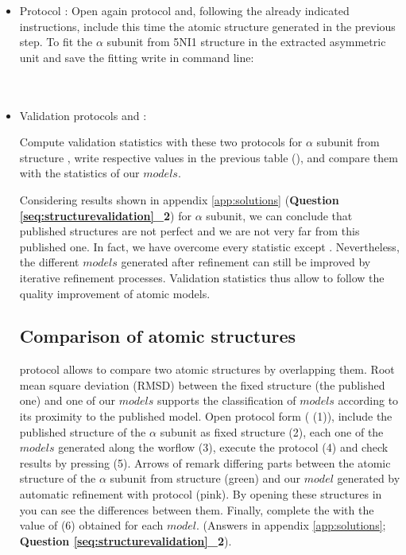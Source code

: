 \begin{itemize}
    \item Protocol :
    Open again \chimera {} protocol and, following the already indicated instructions, include this time the atomic structure  generated in the previous step. To fit the  $\alpha$ subunit from 5NI1 structure in the extracted asymmetric unit and save the fitting write in \chimera command line:\\
    
    \\
    \\
    
    \item{Validation protocols  and }:
    
    Compute validation statistics with these two protocols for  $\alpha$ subunit from  structure , write respective values in the previous table (), and compare them with the statistics of our $models$.
    
    Considering results shown in appendix \ref{app:solutions} (\textbf{Question \ref{seq:structurevalidation}\_2}) for  $\alpha$ subunit, we can conclude that published structures are not perfect and we are not very far from this published one. In fact, we have overcome every statistic except \ccmask. Nevertheless, the different $models$ generated after \coot refinement can still be improved by iterative refinement processes. Validation statistics thus allow to follow the quality improvement of atomic models.\\

 
  \subsection*{Comparison of atomic structures}
  
  \phenix protocol  allows to compare two atomic structures by overlapping them. Root mean square deviation (RMSD) between the fixed structure (the published one) and one of our $models$ supports the classification of $models$ according to its proximity to the published model. Open \phenix {} protocol form ( (1)), include the published structure of the  $\alpha$ subunit as fixed structure (2), each one of the $models$ generated along the worflow (3), execute the protocol (4) and check results by pressing  (5). Arrows of  remark differing parts between the atomic structure of the  $\alpha$ subunit from  structure  (green) and our $model$ generated by automatic refinement with  protocol (pink). By opening these structures in \coot you can see the differences between them. Finally, complete the  with the value of  (6) obtained for each $model$. (Answers in appendix \ref{app:solutions}; \textbf{Question \ref{seq:structurevalidation}\_2}).
  

\end{itemize}
